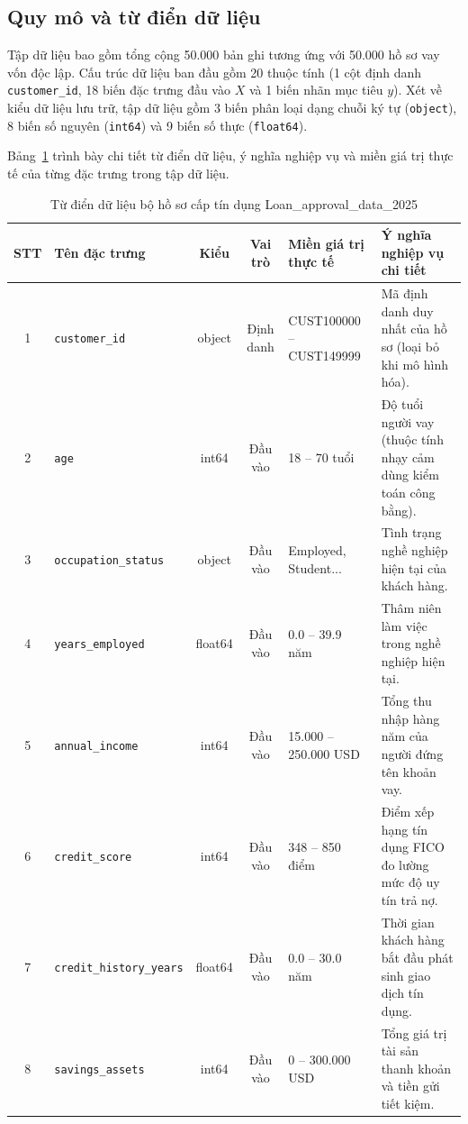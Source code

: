 \documentclass[12pt,a4paper,oneside]{report}
\begin{document}
\subsection{Quy mô và từ điển dữ liệu}
Tập dữ liệu bao gồm tổng cộng 50.000 bản ghi tương ứng với 50.000 hồ sơ vay vốn độc lập. Cấu trúc dữ liệu ban đầu gồm 20 thuộc tính (1 cột định danh \texttt{customer\_id}, 18 biến đặc trưng đầu vào $X$ và 1 biến nhãn mục tiêu $y$). Xét về kiểu dữ liệu lưu trữ, tập dữ liệu gồm 3 biến phân loại dạng chuỗi ký tự (\texttt{object}), 8 biến số nguyên (\texttt{int64}) và 9 biến số thực (\texttt{float64}).

Bảng~\ref{tab:data_dictionary} trình bày chi tiết từ điển dữ liệu, ý nghĩa nghiệp vụ và miền giá trị thực tế của từng đặc trưng trong tập dữ liệu.

\begin{table}[htbp]
\centering
\scriptsize
\caption{Từ điển dữ liệu bộ hồ sơ cấp tín dụng Loan\_approval\_data\_2025}
\label{tab:data_dictionary}
\begin{tabular}{|c|l|c|c|l|p{5.5cm}|}
    \hline
    \textbf{STT} & \textbf{Tên đặc trưng} & \textbf{Kiểu} & \textbf{Vai trò} & \textbf{Miền giá trị thực tế} & \textbf{Ý nghĩa nghiệp vụ chi tiết} \\
    \hline
    1 & \texttt{customer\_id} & object & Định danh & CUST100000 -- CUST149999 & Mã định danh duy nhất của hồ sơ (loại bỏ khi mô hình hóa). \\
    \hline
    2 & \texttt{age} & int64 & Đầu vào & 18 -- 70 tuổi & Độ tuổi người vay (thuộc tính nhạy cảm dùng kiểm toán công bằng). \\
    \hline
    3 & \texttt{occupation\_status} & object & Đầu vào & Employed, Student... & Tình trạng nghề nghiệp hiện tại của khách hàng. \\
    \hline
    4 & \texttt{years\_employed} & float64 & Đầu vào & 0.0 -- 39.9 năm & Thâm niên làm việc trong nghề nghiệp hiện tại. \\
    \hline
    5 & \texttt{annual\_income} & int64 & Đầu vào & 15.000 -- 250.000 USD & Tổng thu nhập hàng năm của người đứng tên khoản vay. \\
    \hline
    6 & \texttt{credit\_score} & int64 & Đầu vào & 348 -- 850 điểm & Điểm xếp hạng tín dụng FICO đo lường mức độ uy tín trả nợ. \\
    \hline
    7 & \texttt{credit\_history\_years} & float64 & Đầu vào & 0.0 -- 30.0 năm & Thời gian khách hàng bắt đầu phát sinh giao dịch tín dụng. \\
    \hline
    8 & \texttt{savings\_assets} & int64 & Đầu vào & 0 -- 300.000 USD & Tổng giá trị tài sản thanh khoản và tiền gửi tiết kiệm. \\

\end{tabular}
\end{table}
\end{document}
